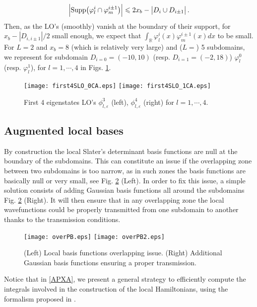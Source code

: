 \documentclass[11pt]{elsarticle}
\let \leq \leqslant
\let \epsilon \varepsilon
\newcommand{\R} {\ensuremath{\mathbb{R}}}
\begin{document}
\begin{eqnarray*}
\Big|\hbox{Supp}\big(\varphi_l^i\cap\varphi^{i\pm 1}_m\big)\Big| \leq 2x_b-\big|D_i \cup D_{i\pm 1}\big| \, .
\end{eqnarray*}
Then, as the LO's (smoothly) vanish at the boundary of their support, for $x_b-|D_{i,i\pm 1}|/2$ small enough, we expect that $\int_{\R}\varphi_l^{i}(x)\varphi^{i\pm1}_m(x)dx$ to be small. For $L=2$ and $x_b=8$ (which is relatively very large) and ($L=$) 5 subdomains, we represent for subdomain $D_{i=0}=(-10,10)$ (resp. $D_{i=1}=(-2,18)$) $\varphi_l^0$ (resp. $\varphi^1_l$), for $l=1,\cdots,4$ in Figs. \ref{SLO_app2}.
\begin{figure}[!ht]
\begin{center}
\hspace*{1mm}\texttt{[image: first4SLO\_0CA.eps]}
\hspace*{1mm}\texttt{[image: first4SLO\_1CA.eps]}
\caption{First 4 eigenstates LO's $\phi_{l,\epsilon}^3$ (left), $\phi_{l,\epsilon}^4$ (right) for $l=1,\cdots,4$.}
\label{SLO_app2}
\end{center}
\end{figure}
\subsection{Augmented local bases}\label{subsec:CB}
By construction the local Slater's determinant basis functions are null at the boundary of the subdomains. This can constitute an issue if the overlapping zone between two subdomains is too narrow, as in such zones the basis functions are basically null or very small, see Fig. \ref{overPB} (Left). In order to fix this issue, a simple solution consists of adding Gaussian basis functions all around the subdomains Fig. \ref{overPB} (Right). It will then ensure that in any overlapping zone the local wavefunctions could be properly transmitted from one subdomain to another thanks to the transmission conditions.
\begin{figure}[!ht]
\begin{center}
\hspace*{1mm}\texttt{[image: overPB.eps]}
\hspace*{1mm}\texttt{[image: overPB2.eps]}
\caption{(Left) Local basis functions overlapping issue. (Right) Additional Gaussian basis functions ensuring a proper transmission.}
\label{overPB}
\end{center}
\end{figure}
Notice that in \ref{APXA}, we present a general strategy to efficiently compute the integrals involved in the construction of the local Hamiltonians, using the formalism proposed in \cite{CAM15-10}.
\end{document}
